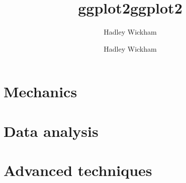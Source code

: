 \documentclass[letterpaper]{scrbook}
\title{ggplot2}
\author{Hadley Wickham}
\begin{document}
\title{ggplot2} 
\author{Hadley Wickham} 
\maketitle 


\tableofcontents




\part*{Mechanics}






\part*{Data analysis}



\part*{Advanced techniques}




\appendix
\appendixpage





\end{document}
